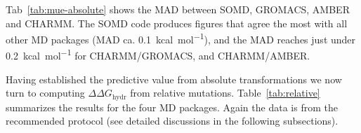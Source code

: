 \documentclass[journal=jctcce,manuscript=article]{achemso}
\begin{document}
Tab~\ref{tab:mue-absolute} shows the MAD between SOMD, GROMACS, AMBER and 
CHARMM. The SOMD code produces figures that agree the most with all other MD packages (MAD ca.  \SI{0.1}{kcal.mol^{-1}}), and the MAD reaches just under 
\SI{0.2}{kcal.mol^{-1}} for CHARMM/GROMACS, and CHARMM/AMBER. 

\begin{table}[]
  \begin{minipage}{\linewidth}
    \caption{Mean Absolute Deviations (MAD) (\SI{}{kcal.mol^{-1}}) between relative free energies obtained with the absolute protocol for the SOMD, GROMACS, AMBER and CHARMM packages.}\label{tab:mue-absolute}
  \end{minipage}
\end{table}

Having established the predictive value from absolute transformations we now turn to computing $\Delta\Delta G_{\mathrm{hydr}}$ from relative mutations.  
Table~\ref{tab:relative} summarizes the results for the four MD packages.  
Again the data is from the recommended protocol (see detailed discussions in 
the following subsections).
\end{document}

